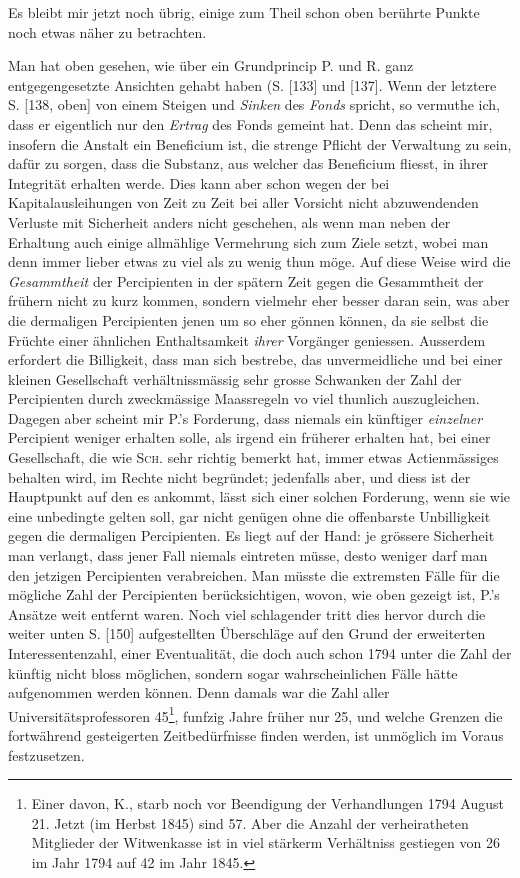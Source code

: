 \par{}
Es bleibt mir jetzt noch übrig, einige zum Theil schon oben berührte Punkte noch etwas näher zu betrachten.

Man hat oben gesehen, wie über ein Grundprincip P. und R. ganz entgegengesetzte Ansichten gehabt haben (S. [133] und [137]. Wenn der letztere S. [138, oben] von einem Steigen und \textit{Sinken} des \textit{Fonds} spricht, so vermuthe ich, dass er eigentlich nur den \textit{Ertrag} des Fonds gemeint hat. Denn das scheint mir, insofern die Anstalt ein Beneficium ist, die strenge Pflicht der Verwaltung zu sein, dafür zu sorgen, dass die Substanz, aus welcher das Beneficium fliesst, in ihrer Integrität erhalten werde. Dies kann aber schon wegen der bei Kapitalausleihungen von Zeit zu Zeit bei aller Vorsicht nicht abzuwendenden Verluste mit Sicherheit anders nicht geschehen, als wenn man neben der Erhaltung auch einige allmählige Vermehrung sich zum Ziele setzt, wobei man denn immer lieber etwas zu viel als zu wenig thun möge. Auf diese Weise wird die \textit{Gesammtheit} der Percipienten in der spätern Zeit gegen die Gesammtheit der frühern nicht zu kurz kommen, sondern vielmehr eher besser daran sein, was aber die dermaligen Percipienten jenen um so eher gönnen können, da sie selbst die Früchte einer ähnlichen Enthaltsamkeit \textit{ihrer} Vorgänger geniessen. Ausserdem erfordert die Billigkeit, dass man sich bestrebe, das unvermeidliche und bei einer kleinen Gesellschaft verhältnissmässig sehr grosse Schwanken der Zahl der Percipienten durch zweckmässige Maassregeln vo viel thunlich auszugleichen. Dagegen aber scheint mir P.’s Forderung, dass niemals ein künftiger \textit{einzelner} Percipient weniger erhalten solle, als irgend ein früherer erhalten hat, bei einer Gesellschaft, die wie \textsc{Sch.} sehr richtig bemerkt hat, immer etwas Actienmässiges behalten wird, im Rechte nicht begründet; jedenfalls aber, und diess ist der Hauptpunkt auf den es ankommt, lässt sich einer solchen Forderung, wenn sie wie eine unbedingte gelten soll, gar nicht genügen ohne die offenbarste Unbilligkeit gegen die dermaligen Percipienten. Es liegt auf der Hand: je grössere Sicherheit man verlangt, dass jener Fall niemals eintreten müsse, desto weniger darf man den jetzigen Percipienten verabreichen. Man müsste die extremsten Fälle für die mögliche Zahl der Percipienten berücksichtigen, wovon, wie oben gezeigt ist, P.’s Ansätze weit entfernt waren. Noch viel schlagender tritt dies hervor durch die weiter unten S. [150] aufgestellten Überschläge auf den Grund der erweiterten Interessentenzahl, einer Eventualität, die doch auch schon 1794 unter die Zahl der künftig nicht bloss möglichen, sondern sogar wahrscheinlichen Fälle hätte aufgenommen werden können. Denn damals war die Zahl aller Universitätsprofessoren 45\footnote{Einer davon, K., starb noch vor Beendigung der Verhandlungen 1794 August 21. Jetzt (im Herbst 1845) sind 57. Aber die Anzahl der verheiratheten Mitglieder der Witwenkasse ist in viel stärkerm Verhältniss gestiegen von 26 im Jahr 1794 auf 42 im Jahr 1845.}, funfzig Jahre früher nur 25, und welche Grenzen die fortwährend gesteigerten Zeitbedürfnisse finden werden, ist unmöglich im Voraus festzusetzen.


